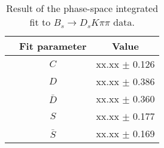 \begin{table}[h]
\centering
\caption{Result of the phase-space integrated fit to $B_s \to D_s K \pi \pi$ data.}
\begin{tabular}{c c c}
\hline
\hline
& Fit parameter & Value \\
\hline
& $C$ &  xx.xx  $\pm$ 0.126\\
&$D$ &  xx.xx  $\pm$ 0.386\\
&$\bar D$ &  xx.xx  $\pm$ 0.360\\
& $S$ &  xx.xx  $\pm$ 0.177\\
& $\bar S$ &  xx.xx  $\pm$ 0.169\\
\hline
\hline
\end{tabular}
\label{table:timeFit_signal}
\end{table}